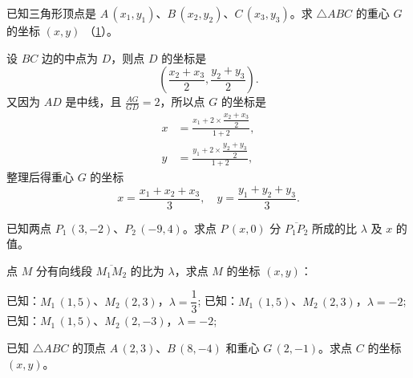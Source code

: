 \begin{example}
  已知三角形顶点是 $A\,(x_1,y_1)$、$B\,(x_2,y_2)$、$C\,(x_3,y_3)$。求 $\triangle ABC$ 的重心 $G$ 的坐标 $(x,y)$ （\cref{fig:1-13}）。
\end{example}
\begin{solution}
  设 $BC$ 边的中点为 $D$，则点 $D$ 的坐标是
  \[ \left(\frac{x_2+x_3}{2},\frac{y_2+y_3}{2}\right).\]
  又因为 $AD$ 是中线，且 $\frac{AG}{GD} = 2$，所以点 $G$ 的坐标是
  \begin{align*}
    x&=\frac{x_1+2\times\dfrac{x_2+x_3}{2}}{1+2}, \\
    y&=\frac{y_1+2\times\dfrac{y_2+y_3}{2}}{1+2}, 
  \end{align*}
  整理后得重心 \(G\) 的坐标
  \[ x=\frac{x_1+x_2+x_3}{3},\quad y=\frac{y_1+y_2+y_3}{3}.\]
\end{solution}
\begin{figure}
  \caption{}\label{fig:1-13}
\end{figure}

\begin{Practice}
  \begin{question}
    \item 已知两点 $P_1\,(3,-2)$、$P_2\,(-9,4)$。求点 $P\,(x,0)$ 分 $\overline{P_1P_2}$ 所成的比 $\lambda$ 及 $x$ 的值。
    \item 点 $M$ 分有向线段 $\overline{M_1M_2}$ 的比为 $\lambda$，求点 $M$ 的坐标 $(x,y)$：
    \begin{tasks}
      \task 已知：$M_1\,(1,5)$、$M_2\,(2,3)$，$\lambda = \dfrac{1}{3}$;
      \task 已知：$M_1\,(1,5)$、$M_2\,(2,3)$，$\lambda = -2$;
      \task 已知：$M_1\,(1,5)$、$M_2\,(2,-3)$，$\lambda = -2$;
    \end{tasks}
    \item 已知 $\triangle ABC$ 的顶点 $A\,(2,3)$、$B\,(8,-4)$ 和重心 $G\,(2,-1)$。求点 $C$ 的坐标 $(x,y)$。
  \end{question}
\end{Practice}

